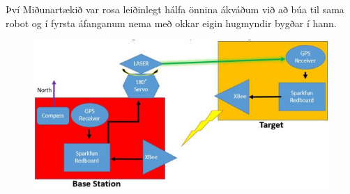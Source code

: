 Því Miðunartækið var rosa leiðinlegt hálfa önnina ákváðum við að búa til sama robot og í fyrsta áfanganum nema með okkar eigin hugmyndir bygðar í hann.
\begin{figure}[h]
\includegraphics[scale=.3]{img/system}
\end{figure}
